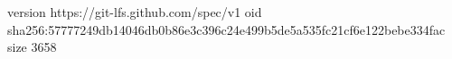 version https://git-lfs.github.com/spec/v1
oid sha256:57777249db14046db0b86e3c396c24e499b5de5a535fc21cf6e122bebe334fac
size 3658
